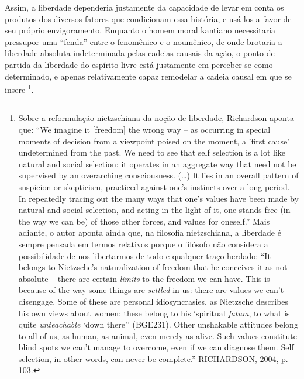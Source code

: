 \documentclass[
	12pt,				%
	openright,			%
	oneside,			%
	a4paper,			%
	english,			%
	french,				%
	spanish,			%
	brazil				%
	]{abntex2}
\begin{document}
Assim, a liberdade dependeria justamente da capacidade de levar em conta os produtos dos diversos fatores que condicionam essa história, e usá-los a favor de seu próprio envigoramento. Enquanto o homem moral kantiano necessitaria pressupor uma “fenda” entre o fenomênico e o noumênico, de onde brotaria a liberdade absoluta indeterminada pelas cadeias causais da ação, o ponto de partida da liberdade do espírito livre está justamente em perceber-se como determinado, e apenas relativamente capaz remodelar a cadeia causal em que se insere
\footnote{Sobre a reformulação nietzschiana da noção de liberdade, Richardson aponta que: “We imagine it [freedom] the wrong way – as occurring in special moments of decision from a viewpoint poised on the moment, a 'first cause' undetermined from the past. We need to see that self selection is a lot like natural and social selection: it operates in an aggregate way that need not be supervised by an overarching consciousness. (…) It lies in an overall pattern of suspicion or skepticism, practiced against one's instincts over a long period. In repeatedly tracing out the many ways that one's values have been made by natural and social selection, and acting in the light of it, one stands free (in the way we can be) of those other forces, and values for oneself.” Mais adiante, o autor aponta ainda que, na filosofia nietzschiana, a liberdade é sempre pensada em termos relativos porque o filósofo não considera a possibilidade de nos libertarmos de todo e qualquer traço herdado: “It belongs to Nietzsche's naturalization of freedom that he conceives it as not absolute – there are certain \textit{limits} to the freedom we can have. This is because of the way some things are \textit{settled} in us: there are values we can't disengage. Some of these are personal idiosyncrasies, as Nietzsche describes his own views about women: these belong to his `spiritual \textit{fatum}, to what is quite \textit{unteachable} `down there'' (BGE231). Other unshakable attitudes belong to all of us, as human, as animal, even merely as alive. Such values constitute blind spots we can't manage to overcome, even if we can diagnose them. Self selection, in other words, can never be complete.” RICHARDSON, 2004, p. 103.}. 
\end{document}
